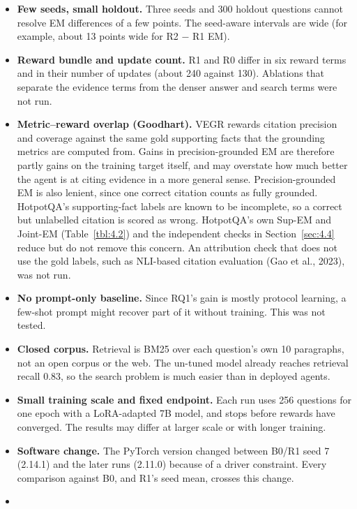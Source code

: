 \begin{itemize}
\tightlist
\item
  \textbf{Few seeds, small holdout.} Three seeds and 300 holdout
  questions cannot resolve EM differences of a few points. The
  seed-aware intervals are wide (for example, about 13 points wide for
  R2 − R1 EM).
\item
  \textbf{Reward bundle and update count.} R1 and R0 differ in six
  reward terms and in their number of updates (about 240 against 130).
  Ablations that separate the evidence terms from the denser answer and
  search terms were not run.
\item
  \textbf{Metric--reward overlap (Goodhart).} VEGR rewards citation
  precision and coverage against the same gold supporting facts that the
  grounding metrics are computed from. Gains in precision-grounded EM
  are therefore partly gains on the training target itself, and may
  overstate how much better the agent is at citing evidence in a more
  general sense. Precision-grounded EM is also lenient, since one
  correct citation counts as fully grounded. HotpotQA's supporting-fact
  labels are known to be incomplete, so a correct but unlabelled
  citation is scored as wrong. HotpotQA's own Sup-EM and Joint-EM
  (Table~\ref{tbl:4.2}) and the independent checks in
  Section~\ref{sec:4.4} reduce but do not remove this concern. An
  attribution check that does not use the gold labels, such as NLI-based
  citation evaluation (Gao et al., 2023), was not run.
\item
  \textbf{No prompt-only baseline.} Since RQ1's gain is mostly protocol
  learning, a few-shot prompt might recover part of it without training.
  This was not tested.
\item
  \textbf{Closed corpus.} Retrieval is BM25 over each question's own 10
  paragraphs, not an open corpus or the web. The un-tuned model already
  reaches retrieval recall 0.83, so the search problem is much easier
  than in deployed agents.
\item
  \textbf{Small training scale and fixed endpoint.} Each run uses 256
  questions for one epoch with a LoRA-adapted 7B model, and stops before
  rewards have converged. The results may differ at larger scale or with
  longer training.
\item
  \textbf{Software change.} The PyTorch version changed between B0/R1
  seed 7 (2.14.1) and the later runs (2.11.0) because of a driver
  constraint. Every comparison against B0, and R1's seed mean, crosses
  this change.
\item

\end{itemize}
